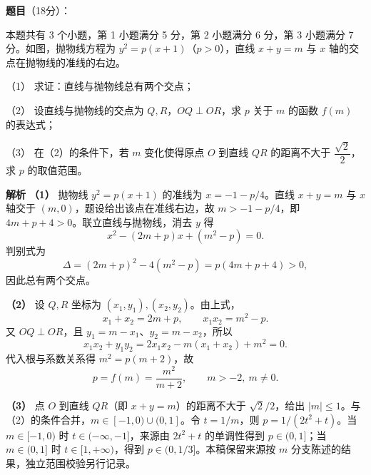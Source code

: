 \begin{answer}

\textbf{题目}（18分）：

本题共有 3 个小题，第 1 小题满分 5 分，第 2 小题满分 6 分，第 3 小题满分 7 分。如图，抛物线方程为 $y^2=p(x+1)$（$p>0$），直线 $x+y=m$ 与 $x$ 轴的交点在抛物线的准线的右边。

（1） 求证：直线与抛物线总有两个交点；

（2） 设直线与抛物线的交点为 $Q,R$，$OQ\perp OR$，求 $p$ 关于 $m$ 的函数 $f(m)$ 的表达式；

（3） 在（2）的条件下，若 $m$ 变化使得原点 $O$ 到直线 $QR$ 的距离不大于 $\dfrac{\sqrt2}{2}$，求 $p$ 的取值范围。
\nopagebreak[4]
\begin{center}\end{center}
\nopagebreak[4]
\textbf{解析}
\textbf{（1）} 抛物线 $y^2=p(x+1)$ 的准线为 $x=-1-p/4$。直线 $x+y=m$ 与 $x$ 轴交于 $(m,0)$，题设给出该点在准线右边，故 $m>-1-p/4$，即 $4m+p+4>0$。联立直线与抛物线，消去 $y$ 得
\nopagebreak[4]
\[x^2-(2m+p)x+(m^2-p)=0.\]
判别式为
\nopagebreak[4]
\[\Delta=(2m+p)^2-4(m^2-p)=p(4m+p+4)>0,\]
因此总有两个交点。

\textbf{（2）} 设 $Q,R$ 坐标为 $(x_1,y_1),(x_2,y_2)$。由上式，
\nopagebreak[4]
\[x_1+x_2=2m+p,\qquad x_1x_2=m^2-p.\]
又 $OQ\perp OR$，且 $y_1=m-x_1$、$y_2=m-x_2$，所以
\nopagebreak[4]
\[x_1x_2+y_1y_2=2x_1x_2-m(x_1+x_2)+m^2=0.\]
代入根与系数关系得 $m^2=p(m+2)$，故
\nopagebreak[4]
\[p=f(m)=\frac{m^2}{m+2},\qquad m>-2,\ m\ne0.\]

\textbf{（3）} 点 $O$ 到直线 $QR$（即 $x+y=m$）的距离不大于 $\sqrt2/2$，给出 $|m|\le1$。与（2）的条件合并，$m\in[-1,0)\cup(0,1]$。令 $t=1/m$，则 $p=1/(2t^2+t)$。当 $m\in[-1,0)$ 时 $t\in(-\infty,-1]$，来源由 $2t^2+t$ 的单调性得到 $p\in(0,1]$；当 $m\in(0,1]$ 时 $t\in[1,+\infty)$，得到 $p\in(0,1/3]$。本稿保留来源按 $m$ 分支陈述的结果，独立范围校验另行记录。



\gkanswer{答案（3）：$m\in[-1,0)$ 时 $p\in(0,1]$；$m\in(0,1]$ 时 $p\in\left(0,\dfrac13\right]$。}

\end{answer}
